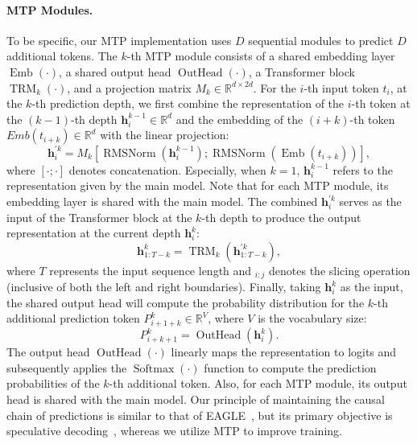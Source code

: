\documentclass[11pt, a4paper, logo, copyright, nonumbering]{deepseek}
\begin{document}
\begin{CJK*}{UTF8}{gbsn}
\paragraph{MTP Modules.}
To be specific, our MTP implementation uses $D$ sequential modules to predict $D$ additional tokens. 
The $k$-th MTP module consists of a shared embedding layer $\operatorname{Emb}(\cdot)$, a shared output head $\operatorname{OutHead}(\cdot)$, a Transformer block $\operatorname{TRM}_k(\cdot)$, and a projection matrix $M_k \in \mathbb{R}^{d \times 2d}$. 
For the $i$-th input token $t_i$, at the $k$-th prediction depth, we first combine the representation of the $i$-th token at the $(k-1)$-th depth $\mathbf{h}_i^{k-1} \in \mathbb{R}^{d}$ and the embedding of the $(i+k)$-th token $Emb(t_{i+k}) \in \mathbb{R}^{d}$ with the linear projection: 
\begin{equation}
    \mathbf{h}_i^{\prime k} = M_k [\operatorname{RMSNorm}(\mathbf{h}_i^{k-1}) ; \operatorname{RMSNorm}(\operatorname{Emb}(t_{i+k}))],
\end{equation}
where $[\cdot ; \cdot]$ denotes concatenation. 
Especially, when $k=1$, $\mathbf{h}_i^{k-1}$ refers to the representation given by the main model.
Note that for each MTP module, its embedding layer is shared with the main model. 
The combined $\mathbf{h}_i^{\prime k}$ serves as the input of the Transformer block at the $k$-th depth to produce the output representation at the current depth $\mathbf{h}_{i}^{k}$:
\begin{equation}
    \mathbf{h}_{1:T-k}^{k} = \operatorname{TRM}_k(\mathbf{h}_{1:T-k}^{\prime k}),
\end{equation}
where $T$ represents the input sequence length and $_{i:j}$ denotes the slicing operation (inclusive of both the left and right boundaries). 
Finally, taking $\mathbf{h}_{i}^{k}$ as the input, the shared output head will compute the probability distribution for the $k$-th additional prediction token $P_{i+1+k}^{k} \in \mathbb{R}^{V}$, where $V$ is the vocabulary size:
\begin{equation}
    P_{i+k+1}^{k} = \operatorname{OutHead}(\mathbf{h}_{i}^{k}).
\end{equation}
The output head $\operatorname{OutHead}(\cdot)$ linearly maps the representation to logits and subsequently applies the $\operatorname{Softmax}(\cdot)$ function to compute the prediction probabilities of the $k$-th additional token. 
Also, for each MTP module, its output head is shared with the main model. 
Our principle of maintaining the causal chain of predictions is similar to that of EAGLE~\citep{eagle}, but its primary objective is speculative decoding~\citep{speculative_xhm,speculative_google}, whereas we utilize MTP to improve training.


\end{CJK*}
\end{document}
